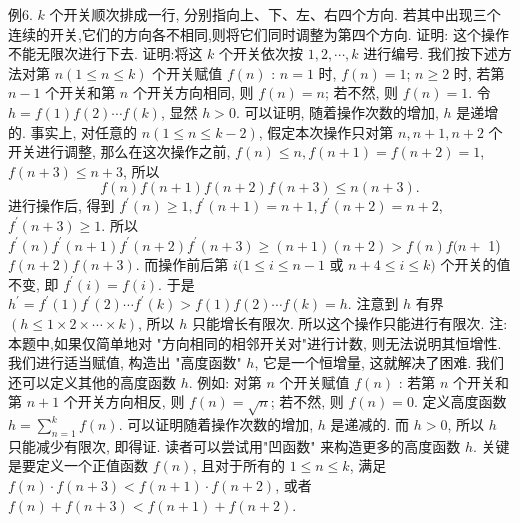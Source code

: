 例6. $k$ 个开关顺次排成一行, 分别指向上、下、左、右四个方向.
若其中出现三个连续的开关,它们的方向各不相同,则将它们同时调整为第四个方向.
证明: 这个操作不能无限次进行下去.
证明:将这 $k$ 个开关依次按 $1,2, \cdots, k$ 进行编号.
我们按下述方法对第 $n(1 \leqslant n \leqslant k)$ 个开关赋值 $f(n)$ :
$n=1$ 时, $f(n)=1$;
$n \geqslant 2$ 时, 若第 $n-1$ 个开关和第 $n$ 个开关方向相同, 则 $f(n)=n$; 若不然, 则 $f(n)=1$.
令 $h=f(1) f(2) \cdots f(k)$, 显然 $h>0$. 可以证明, 随着操作次数的增加, $h$ 是递增的.
事实上, 对任意的 $n(1 \leqslant n \leqslant k-2)$, 假定本次操作只对第 $n, n+1, n+2$ 个开关进行调整, 那么在这次操作之前, $f(n) \leqslant n, f(n+1)=f(n+2)=1$, $f(n+3) \leqslant n+3$, 所以
$$
f(n) f(n+1) f(n+2) f(n+3) \leqslant n(n+3) .
$$
进行操作后, 得到 $f^{\prime}(n) \geqslant 1, f^{\prime}(n+1)=n+1, f^{\prime}(n+2)=n+2$, $f^{\prime}(n+3) \geqslant 1$.
所以 $f^{\prime}(n) f^{\prime}(n+1) f^{\prime}(n+2) f^{\prime}(n+3) \geqslant(n+1)(n+2)>f(n) f(n+$ 1) $f(n+2) f(n+3)$.
而操作前后第 $i(1 \leqslant i \leqslant n-1$ 或 $n+4 \leqslant i \leqslant k)$ 个开关的值不变, 即 $f^{\prime}(i)=f(i)$.
于是 $h^{\prime}=f^{\prime}(1) f^{\prime}(2) \cdots f^{\prime}(k)>f(1) f(2) \cdots f(k)=h$.
注意到 $h$ 有界 $(h \leqslant 1 \times 2 \times \cdots \times k)$, 所以 $h$ 只能增长有限次.
所以这个操作只能进行有限次.
注:本题中,如果仅简单地对 "方向相同的相邻开关对"进行计数, 则无法说明其恒增性.
我们进行适当赋值, 构造出 "高度函数" $h$, 它是一个恒增量, 这就解决了困难.
我们还可以定义其他的高度函数 $h$. 例如: 对第 $n$ 个开关赋值 $f(n)$ : 若第 $n$ 个开关和第 $n+1$ 个开关方向相反, 则 $f(n)=\sqrt{n}$; 若不然, 则 $f(n)=0$. 定义高度函数 $h=\sum_{n=1}^k f(n)$. 可以证明随着操作次数的增加, $h$ 是递减的.
而 $h>0$, 所以 $h$ 只能减少有限次, 即得证.
读者可以尝试用"凹函数" 来构造更多的高度函数 $h$. 关键是要定义一个正值函数 $f(n)$, 且对于所有的 $1 \leqslant n \leqslant k$, 满足 $f(n) \cdot f(n+3)<f(n+1) \cdot f(n+2)$, 或者 $f(n)+f(n+3)<f(n+1)+f(n+2)$.



